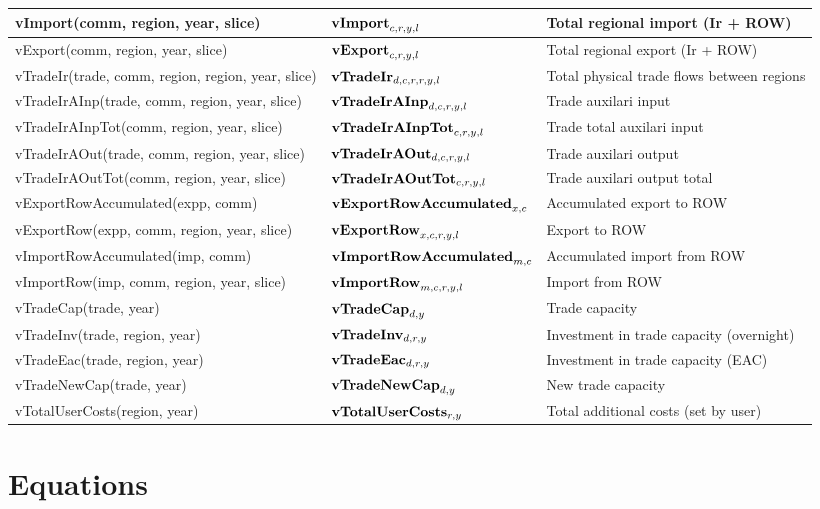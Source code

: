 \documentclass{article}
\begin{document}
\begin{longtable}{|p{10cm}|p{5cm}|p{9cm}|}
 \hline
vImport(comm, region, year, slice) & ${\bf vImport}_{c,r,y,l}$ & Total regional import (Ir + ROW) \\ 
 \hline
vExport(comm, region, year, slice) & ${\bf vExport}_{c,r,y,l}$ & Total regional export (Ir + ROW) \\ 
 \hline
vTradeIr(trade, comm, region, region, year, slice) & ${\bf vTradeIr}_{d,c,r,r,y,l}$ & Total physical trade flows between regions \\ 
 \hline
vTradeIrAInp(trade, comm, region, year, slice) & ${\bf vTradeIrAInp}_{d,c,r,y,l}$ & Trade auxilari input \\ 
 \hline
vTradeIrAInpTot(comm, region, year, slice) & ${\bf vTradeIrAInpTot}_{c,r,y,l}$ & Trade total auxilari input \\ 
 \hline
vTradeIrAOut(trade, comm, region, year, slice) & ${\bf vTradeIrAOut}_{d,c,r,y,l}$ & Trade auxilari output \\ 
 \hline
vTradeIrAOutTot(comm, region, year, slice) & ${\bf vTradeIrAOutTot}_{c,r,y,l}$ & Trade auxilari output total \\ 
 \hline
vExportRowAccumulated(expp, comm) & ${\bf vExportRowAccumulated}_{x,c}$ & Accumulated export to ROW \\ 
 \hline
vExportRow(expp, comm, region, year, slice) & ${\bf vExportRow}_{x,c,r,y,l}$ & Export to ROW \\ 
 \hline
vImportRowAccumulated(imp, comm) & ${\bf vImportRowAccumulated}_{m,c}$ & Accumulated import from ROW \\ 
 \hline
vImportRow(imp, comm, region, year, slice) & ${\bf vImportRow}_{m,c,r,y,l}$ & Import from ROW \\ 
 \hline
vTradeCap(trade, year) & ${\bf vTradeCap}_{d,y}$ & Trade capacity \\ 
 \hline
vTradeInv(trade, region, year) & ${\bf vTradeInv}_{d,r,y}$ & Investment in trade capacity (overnight) \\ 
 \hline
vTradeEac(trade, region, year) & ${\bf vTradeEac}_{d,r,y}$ & Investment in trade capacity (EAC) \\ 
 \hline
vTradeNewCap(trade, year) & ${\bf vTradeNewCap}_{d,y}$ & New trade capacity \\ 
 \hline
vTotalUserCosts(region, year) & ${\bf vTotalUserCosts}_{r,y}$ & Total additional costs (set by user) \\ 
 \hline
\end{longtable}

\section*{Equations}
\end{document}
